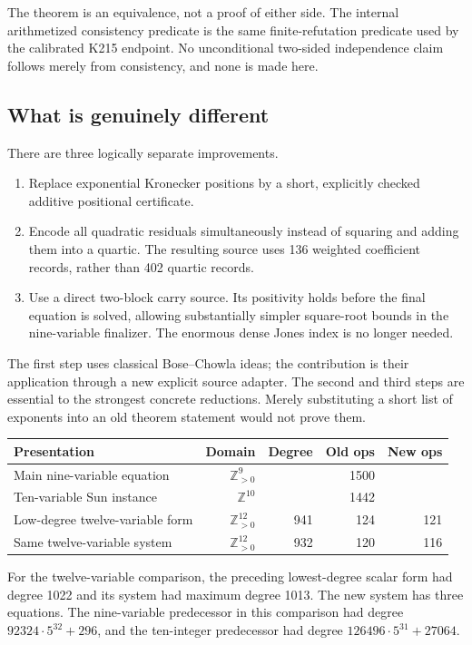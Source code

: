\documentclass[11pt]{article}
\newcommand{\Z}{\mathbb Z}
\newcommand{\Pos}{\mathbb Z_{>0}}
\begin{document}
The theorem is an equivalence, not a proof of either side. The internal
arithmetized consistency predicate is the same finite-refutation predicate
used by the calibrated K215 endpoint. No unconditional two-sided independence
claim follows merely from consistency, and none is made here.

\subsection{What is genuinely different}

There are three logically separate improvements.
\begin{enumerate}
\item Replace exponential Kronecker positions by a short, explicitly checked
additive positional certificate.
\item Encode all quadratic residuals simultaneously instead of squaring and
adding them into a quartic. The resulting source uses 136 weighted coefficient
records, rather than 402 quartic records.
\item Use a direct two-block carry source. Its positivity holds before the
final equation is solved, allowing substantially simpler square-root bounds
in the nine-variable finalizer. The enormous dense Jones index is no longer
needed.
\end{enumerate}
The first step uses classical Bose--Chowla ideas; the contribution is their
application through a new explicit source adapter. The second and third steps
are essential to the strongest concrete reductions. Merely substituting a
short list of exponents into an old theorem statement would not prove them.

\begin{center}\small
\begin{tabular}{@{}p{}rrrr@{}}
\toprule
Presentation & Domain & Degree & Old ops & New ops\\
\midrule
Main nine-variable equation & $\Pos^9$ & \NineDegree{} & 1500 & \NineOps{}\\
Ten-variable Sun instance & $\Z^{10}$ & \TenDegree{} & 1442 & \TenOps{}\\
Low-degree twelve-variable form & $\Pos^{12}$ & 941 & 124 & 121\\
Same twelve-variable system & $\Pos^{12}$ & 932 & 120 & 116\\
\bottomrule
\end{tabular}
\end{center}
For the twelve-variable comparison, the preceding lowest-degree scalar form
had degree 1022 and its system had maximum degree 1013. The new system has
three equations. The nine-variable predecessor in this comparison had degree
$92324\cdot5^{32}+296$, and the ten-integer predecessor had degree
$126496\cdot5^{31}+27064$.
\end{document}
